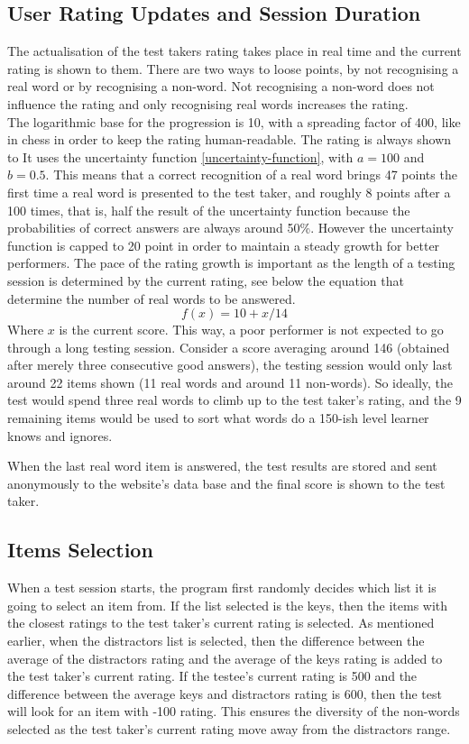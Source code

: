 \subsection{User Rating Updates and Session Duration}
The actualisation of the test takers rating takes place in real time and the current rating is shown to them. There are two ways to loose points, by not recognising a real word or by recognising a non-word. Not recognising a non-word does not influence the rating and only recognising real words increases the rating.\\
The logarithmic base for the progression is 10, with a spreading factor of 400, like in chess in order to keep the rating human-readable. The rating is always shown to  It uses the uncertainty function \ref{uncertainty-function}, with $a=100$ and $b=0.5$. This means that a correct recognition of a real word brings 47 points the first time a real word is presented to the test taker, and roughly 8 points after a 100 times, that is, half the result of the uncertainty function because the probabilities of correct answers are always around 50\%. However the uncertainty function is capped to 20 point in order to maintain a steady growth for better performers. The pace of the rating growth is important as the length of a testing session is determined by the current rating, see below the equation that determine the number of real words to be answered.
\begin{equation}
    f(x)=10 + x/14
\end{equation}\label{length-function}
Where $x$ is the current score. This way, a poor performer is not expected to go through a long testing session. Consider a score averaging around 146 (obtained after merely three consecutive good answers), the testing session would only last around 22 items shown (11 real words and around 11 non-words). So ideally, the test would spend three real words to climb up to the test taker's rating, and the 9 remaining items would be used to sort what words do a 150-ish level learner knows and ignores.

When the last real word item is answered, the test results are stored and sent anonymously to the website's data base and the final score is shown to the test taker.

\subsection{Items Selection}
When a test session starts, the program first randomly decides which list it is going to select an item from. If the list selected is the keys, then the items with the closest ratings to the test taker's current rating is selected. As mentioned earlier, when the distractors list is selected, then the difference between the average of the distractors rating and the average of the keys rating is added to the test taker's current rating. If the testee's current rating is 500 and the difference between the average keys and distractors rating is 600, then the test will look for an item with -100 rating. This ensures the diversity of the non-words selected as the test taker's current rating move away from the distractors range.

